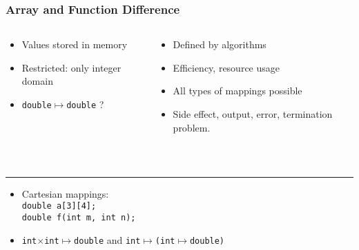 \begin{frame}
 \frametitle{Array and Function Difference}
  \begin{columns}
   \begin{column}{.5\textwidth}
	\begin{itemize}
	 \item Values stored in memory
	 \item Restricted: only integer domain
	 \item \texttt{double$\mapsto$double} ?
	\end{itemize}
   \end{column}
   \begin{column}{.5\textwidth}
	\begin{itemize}
	 \item Defined by  algorithms
	 \item Efficiency, resource usage
	 \item All types of mappings possible
	 \item Side effect, output, error, termination problem.
	\end{itemize}
   \end{column}
  \end{columns}\ \\ \hrule
 \begin{itemize}
  \item Cartesian mappings:\\
	\texttt{double a[3][4];}\\
	\texttt{double f(int m, int n);}
  \item \texttt{int$\times$int$\mapsto$double} and \texttt{int$\mapsto$(int$\mapsto$double)}
 \end{itemize}
\end{frame}


